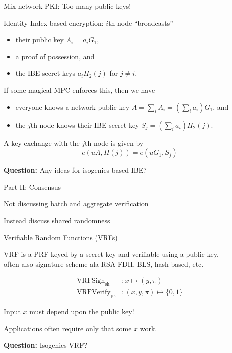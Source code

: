 \documentclass[fleqn,xcolor={usenames,dvipsnames},notes,aspectratio=169]{beamer} %
\begin{document}
\begin{frame}{Mix network PKI: Too many public keys!}

\sout{Identity} Index-based encryption:
$i$th node ``broadcasts''
\begin{itemize}
\item their public key $A_i = a_i G_1$, 
\item a proof of possession, and
\item the IBE secret keys $a_i H_2(j)$ for $j \neq i$.
\end{itemize}
If some magical MPC enforces this, then we have
\begin{itemize}
\item everyone knows a network public key $A = \sum_i A_i = (\sum_i a_i) G_1$, and
\item the $j$th node knows their IBE secret key $S_j = (\sum_i a_i) H_2(j)$.
\end{itemize}
A key exchange with the $j$th node is given by
$$ e(u A,H(j)) = e(u G_1,S_j) $$

\medskip

{\bf Question:}  Any ideas for isogenies based IBE?

\end{frame}


\begin{frame}{Part II:  Consensus}

Not discussing batch and aggregate verification

\bigskip
\hspace{20pt}Instead discuss shared randomness

\end{frame}


\begin{frame}[t]{Verifiable Random Functions (VRFs)}

VRF is a PRF keyed by a secret key and verifiable using a public key, \\
often also signature scheme ala RSA-FDH, BLS, hash-based, etc.

\begin{align*}
\mathrm{VRFSign}_{\mathrm{sk}} &: x \mapsto (y,\pi) \\
\mathrm{VRFVerify}_{\mathrm{pk}} &: (x,y,\pi) \mapsto \{0,1\} 
\end{align*}

\medskip

Input $x$ must depend upon the public key!

\medskip

Applications often require only that some $x$ work.

\bigskip
\bigskip

{\bf Question:}  Isogenies VRF?

\end{frame}
\end{document}
